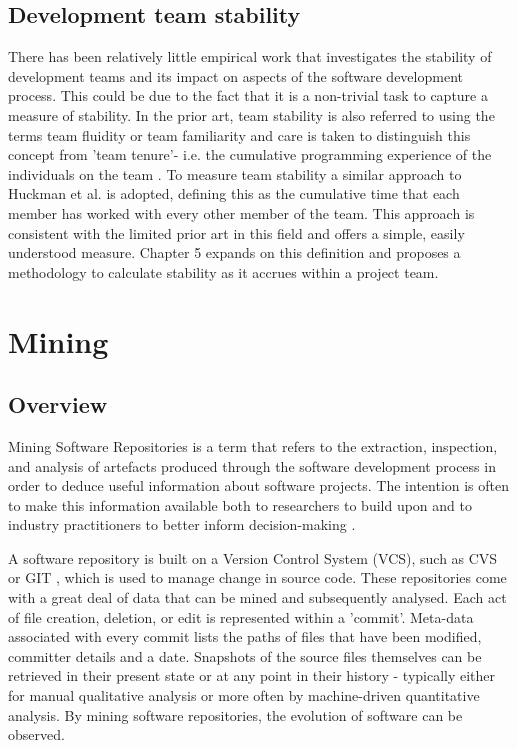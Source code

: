 \subsection{Development team stability}
There has been relatively little empirical work that investigates the stability of development teams and its impact on aspects of the software development process. This could be due to the fact that it is a non-trivial task to capture a measure of stability. In the prior art, team stability is also referred to using the terms team fluidity or team familiarity \citep{huckman2009team} and care is taken to distinguish this concept from 'team tenure'- i.e. the cumulative programming experience of the individuals on the team \citep{hackman2002leading}. To measure team stability a similar approach to Huckman et al. \citep{huckman2009team} is adopted, defining this as the cumulative time that each member has worked with every other member of the team. This approach is consistent with the limited prior art in this field and offers a simple, easily understood measure. Chapter 5 expands on this definition and proposes a methodology to calculate stability as it accrues within a project team.
	
\section{Mining} %
\subsection{Overview}
Mining Software Repositories is a term that refers to the extraction, inspection, and analysis of artefacts produced through the software development process in order to deduce useful information about software projects. The intention is often to make this information available both to researchers to build upon and to industry practitioners to better inform decision-making \citep{hassan2008road}.

A software repository is built on a Version Control System (VCS), such as CVS \citep{cvs} or GIT \citep{git}, which is used to manage change in source code. These repositories come with a great deal of data that can be mined and subsequently analysed. Each act of file creation, deletion, or edit is represented within a 'commit'. Meta-data associated with every commit lists the paths of files that have been modified, committer details and a date. Snapshots of the source files themselves can be retrieved in their present state or at any point in their history - typically either for manual qualitative analysis or more often by machine-driven quantitative analysis. By mining software repositories, the evolution of software can be observed. 

